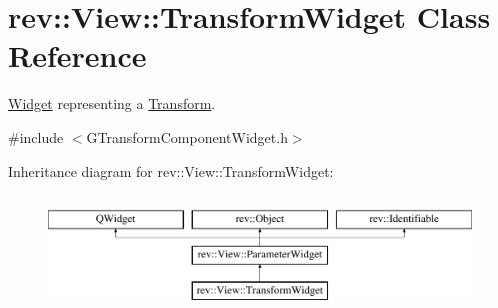 \hypertarget{classrev_1_1_view_1_1_transform_widget}{}\section{rev\+::View\+::Transform\+Widget Class Reference}
\label{classrev_1_1_view_1_1_transform_widget}


\mbox{\hyperlink{class_widget}{Widget}} representing a \mbox{\hyperlink{classrev_1_1_transform}{Transform}}.  




{\ttfamily \#include $<$G\+Transform\+Component\+Widget.\+h$>$}

Inheritance diagram for rev\+::View\+::Transform\+Widget\+:\begin{figure}[H]
\begin{center}
\leavevmode
\includegraphics[height=3.000000cm]{classrev_1_1_view_1_1_transform_widget}
\end{center}
\end{figure}
